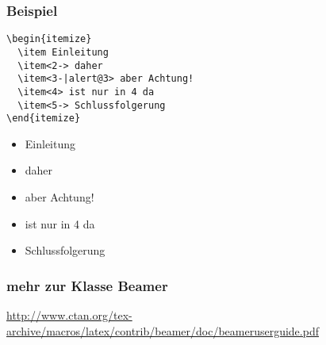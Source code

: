 \begin{frame}[fragile]
\frametitle{Beispiel}\vspace{-5pt}
\begin{lstlisting}[style=Latex]
\begin{itemize}
  \item Einleitung
  \item<2-> daher
  \item<3-|alert@3> aber Achtung!
  \item<4> ist nur in 4 da
  \item<5-> Schlussfolgerung
\end{itemize}
\end{lstlisting}\vspace{-25pt}\pause
\begin{itemize}
  \item Einleitung
  \item<2-> daher
  \item<3-|alert@3> aber Achtung!
  \item<4> ist nur in 4 da
  \item<5-> Schlussfolgerung
\end{itemize}
\end{frame}


\begin{frame}\frametitle{mehr zur Klasse Beamer}
\url{http://www.ctan.org/tex-archive/macros/latex/contrib/beamer/doc/beameruserguide.pdf}
\end{frame}